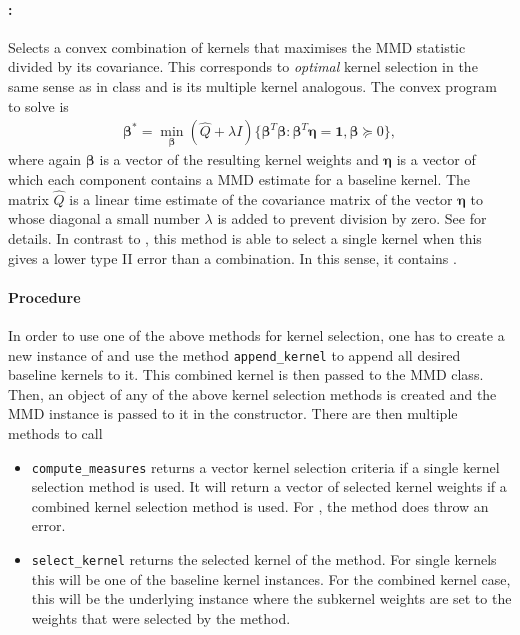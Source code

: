 \paragraph{:} Selects a convex combination of kernels that maximises the MMD statistic divided by its covariance. This corresponds to \emph{optimal} kernel selection in the same sense as in class  and is its multiple kernel analogous. The convex program to solve is
\begin{align*}
\boldsymbol{\beta}^*=\min_{\boldsymbol{\beta}} (\hat Q+\lambda I) \{\boldsymbol{\beta}^T\boldsymbol{\beta}  :  \boldsymbol{\beta}^T\boldsymbol{\eta}=\mathbf{1}, \boldsymbol{\beta}\succeq 0\},
\end{align*}
where again $\boldsymbol{\beta}$ is a vector of the resulting kernel weights and $\boldsymbol{\eta}$ is a vector of which each component contains a MMD estimate for a baseline kernel. The matrix $\hat Q$ is a linear time estimate of the covariance matrix of the vector $\boldsymbol{\eta}$ to whose diagonal a small number $\lambda$ is added to prevent division by zero. See \citep{Gretton2012a} for details. In contrast to , this method is able to select a single kernel when this gives a lower type II error than a combination. In this sense, it contains .

\paragraph{Procedure}
In order to use one of the above methods for kernel selection, one has to create a new instance of  and use the method \texttt{append\_kernel} to append all desired baseline kernels to it. This combined kernel is then passed to the MMD class. Then, an object of any of the above kernel selection methods is created and the MMD instance is passed to it in the constructor. There are then multiple methods to call
\begin{itemize}
\item \texttt{compute\_measures} returns a vector kernel selection criteria if a single kernel selection method is used. It will return a vector of selected kernel weights if a combined kernel selection method is used. For , the method does throw an error.

\item \texttt{select\_kernel} returns the selected kernel of the method. For single kernels this will be one of the baseline kernel instances. For the combined kernel case, this will be the underlying  instance where the subkernel weights are set to the weights that were selected by the method. 
\end{itemize}

